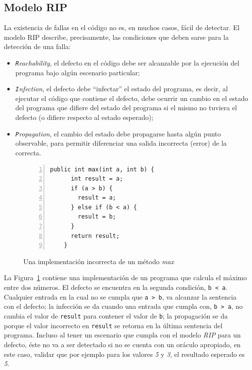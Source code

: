 \subsection{Modelo RIP}

La existencia de fallas en el c\'odigo no es, en muchos casos, f\'acil de detectar. El modelo RIP describe, precisamente, las condiciones que deben sarse para la detecci\'on de una falla: 
\begin{itemize}
\item \emph{\texttt{R}eachability}, el defecto en el c\'odigo debe ser alcanzable por la ejecuci\'on del programa bajo alg\'un escenario particular;
\item \emph{\texttt{I}nfection}, el defecto debe ``infectar'' el estado del programa, es decir, al ejecutar el c\'odigo que contiene el defecto, debe ocurrir un cambio en el estado del programa que difiere del estado del programa si el mismo no tuviera el defecto (o difiere respecto al estado esperado); 
\item \emph{\texttt{P}ropagation}, el cambio del estado debe propagarse hasta alg\'un punto observable, para permitir diferenciar una salida incorrecta (error) de la correcta.
\end{itemize}

\begin{figure}
	\begin{lstlisting}[frame=single,numbers=left, mathescape=true,framexleftmargin=1.5em]
    public int max(int a, int b) {
      int result = a;
      if (a > b) {
        result = a;
      } else if (b < a) {
        result = b;
      }
      return result;
    }
	\end{lstlisting}
	\caption{Una implementaci\'on incorrecta de un m\'etodo \emph{max}}
	\label{figures.examples.testing.rip}
\end{figure}

La Figura~\ref{figures.examples.testing.rip} contiene una implementaci\'on de un programa que calcula el m\'aximo entre dos n\'umeros. El defecto se encuentra en la segunda condici\'on, \texttt{b < a}. Cualquier entrada en la cual no se cumpla que \texttt{a > b}, va alcanzar la sentencia con el defecto; la infecci\'on se da cuando una entrada que cumpla con, \texttt{b > a}, no cambia el valor de \texttt{result} para contener el valor de \texttt{b}; la propagaci\'on se da porque el valor incorrecto en \texttt{result} se retorna en la \'ultima sentencia del programa. Incluso al tener un escenario que cumpla con el modelo \emph{RIP} para un defecto, \'este no va a ser detectado si no se cuenta con un or\'aculo apropiado, en este caso, validar que por ejemplo para los valores \emph{5} y \emph{3}, el resultado esperado es \emph{5}.


